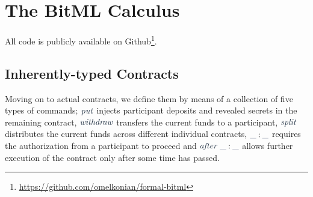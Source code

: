 \documentclass[acmsmall,nonacm=true,screen=true]{acmart}
\newcommand\site[1]{\footnote{\url{#1}}}
\newcommand*{\mathcolor}{}
\def\mathcolor#1#{\mathcoloraux{#1}}
\newcommand*{\mathcoloraux}[3]{%
  \protect\leavevmode
  \begingroup
    \color#1{#2}#3%
  \endgroup
}
\newcommand{\HSSym}[1]{\mathcolor{hsblue4}{\ensuremath{#1}}}
\newcommand{\HSVar}[1]{\mathcolor{hsblue5}{\mathit{\ensuremath{#1}}}}
\begin{document}
\section{The BitML Calculus} 
All code is publicly available on Github\site{https://github.com/omelkonian/formal-bitml}.

\subsection{Inherently-typed Contracts}
Moving on to actual contracts, we define them by means of a collection of five types of commands;
\ensuremath{\HSVar{put}} injects participant deposits and revealed secrets in the remaining contract,
\ensuremath{\HSVar{withdraw}} transfers the current funds to a participant,
\ensuremath{\HSVar{split}} distributes the current funds across different individual contracts,
\ensuremath{\HSSym{\_}\mathbin{:}\HSSym{\_}} requires the authorization from a participant to proceed
and \ensuremath{\HSVar{after}\;\HSSym{\_}\mathbin{:}\HSSym{\_}} allows further execution of the contract only after some time has passed.
\end{document}
